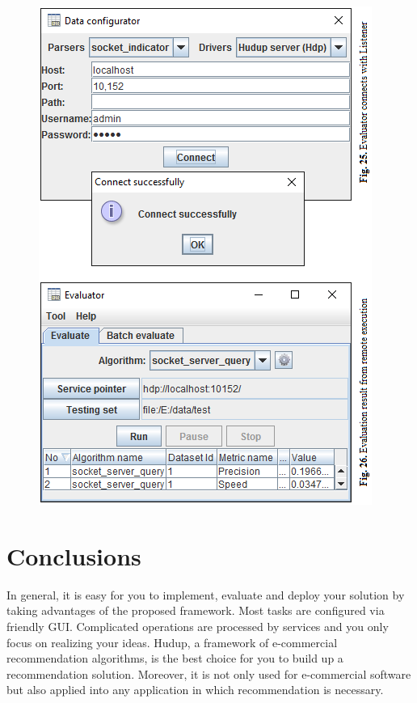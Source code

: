 \documentclass[a4paper]{llncs}
\begin{document}
\begin{figure}
\centering
\includegraphics{MultiFigures-6.png}
\end{figure}

\section{Conclusions}
\label{sec:conclusions}
In general, it is easy for you to implement, evaluate and deploy your solution by taking advantages of the proposed framework. Most tasks are configured via friendly GUI. Complicated operations are processed by services and you only focus on realizing your ideas. Hudup, a framework of e-commercial recommendation algorithms, is the best choice for you to build up a recommendation solution. Moreover, it is not only used for e-commercial software but also applied into any application in which recommendation is necessary.
\end{document}
